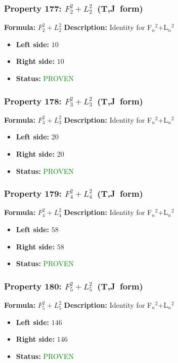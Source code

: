 \subsubsection*{Property 177: $F_{2}^2+L_{2}^2$~(T,J~form)}
\textbf{Formula:} $F_2^2+L_2^2$
\textbf{Description:} Identity for F$_n$$^2$+L$_n$$^2$

\begin{itemize}
\item \textbf{Left side:} $10$
\item \textbf{Right side:} $10$
\item \textbf{Status:} \textcolor{green}{PROVEN}
\end{itemize}

\subsubsection*{Property 178: $F_{3}^2+L_{3}^2$~(T,J~form)}
\textbf{Formula:} $F_3^2+L_3^2$
\textbf{Description:} Identity for F$_n$$^2$+L$_n$$^2$

\begin{itemize}
\item \textbf{Left side:} $20$
\item \textbf{Right side:} $20$
\item \textbf{Status:} \textcolor{green}{PROVEN}
\end{itemize}

\subsubsection*{Property 179: $F_{4}^2+L_{4}^2$~(T,J~form)}
\textbf{Formula:} $F_4^2+L_4^2$
\textbf{Description:} Identity for F$_n$$^2$+L$_n$$^2$

\begin{itemize}
\item \textbf{Left side:} $58$
\item \textbf{Right side:} $58$
\item \textbf{Status:} \textcolor{green}{PROVEN}
\end{itemize}

\subsubsection*{Property 180: $F_{5}^2+L_{5}^2$~(T,J~form)}
\textbf{Formula:} $F_5^2+L_5^2$
\textbf{Description:} Identity for F$_n$$^2$+L$_n$$^2$

\begin{itemize}
\item \textbf{Left side:} $146$
\item \textbf{Right side:} $146$
\item \textbf{Status:} \textcolor{green}{PROVEN}
\end{itemize}

